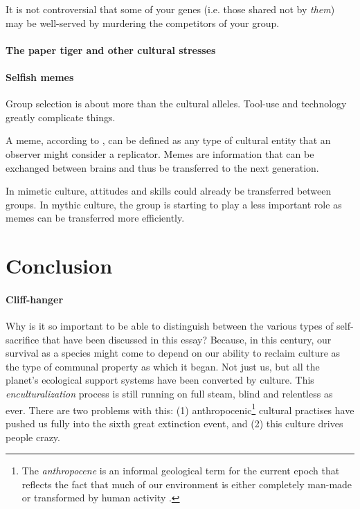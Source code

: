 \documentclass{article}
\begin{document}

It is not controversial that some of your genes (i.e. those shared not by
\emph{them}) may be well-served by murdering the competitors of your group.

\paragraph{The paper tiger and other cultural stresses}

\paragraph{Selfish memes}

Group selection is about more than the cultural alleles. Tool-use and
technology greatly complicate things.

A meme, according to \citet{dawkins1976}, can be defined as any type of
cultural entity that an observer might consider a replicator.  Memes are
information that can be exchanged between brains and thus be transferred to the
next generation.

In mimetic culture, attitudes and skills could already be transferred between
groups. In mythic culture, the group is starting to play a less important role
as memes can be transferred more efficiently.

\section{Conclusion}

\paragraph{Cliff-hanger}

Why is it so important to be able to distinguish between the various types
of self-sacrifice that have been discussed in this essay? Because, in this century,
our survival as a species might come to depend on our ability to reclaim culture
as the type of communal property as which it began. Not just us, but all the
planet's ecological support systems have been converted by culture. This
\textit{enculturalization} process is still running on full steam, blind and
relentless as ever. There are two problems with this: (1)
anthropocenic\footnote{The \emph{anthropocene} is an informal geological term for
the current epoch that reflects the fact that much of our environment is either
completely man-made or transformed by human activity \citep{revkin2011}.}
cultural practises have pushed us fully into the sixth great extinction event,
and (2) this culture drives people crazy.
\end{document}
